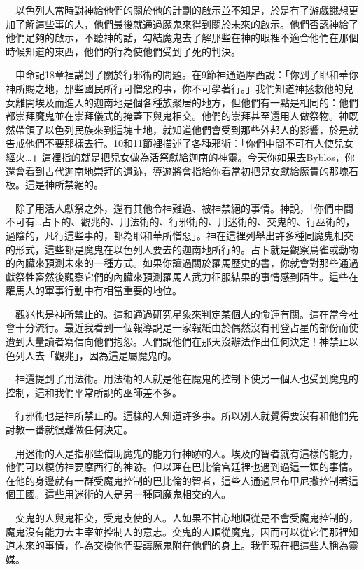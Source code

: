 \documentclass{book}
\begin{document}
　以色列人當時對神給他們的關於他的計劃的啟示並不知足，於是有了游戲餓想更加了解這些事的人，他們最後就通過魔鬼來得到關於未來的啟示。他們否認神給了他們足夠的啟示，不聽神的話，勾結魔鬼去了解那些在神的眼裡不適合他們在那個時候知道的東西，他們的行為使他們受到了死的判決。

　申命記18章裡講到了關於行邪術的問題。在9節神通過摩西說：「你到了耶和華你神所賜之地，那些國民所行可憎惡的事，你不可學著行。」我們知道神拯救他的兒女離開埃及而進入的迦南地是個各種族聚居的地方，但他們有一點是相同的：他們都崇拜魔鬼並在崇拜儀式的掩蓋下與鬼相交。他們的崇拜甚至還用人做祭物。神既然帶領了以色列民族來到這塊土地，就知道他們會受到那些外邦人的影響，於是就告戒他們不要那樣去行。10和11節裡描述了各種邪術：「你們中間不可有人使兒女經火…」這裡指的就是把兒女做為活祭獻給迦南的神靈。今天你如果去Byblos，你還會看到古代迦南地崇拜的遺跡，導遊將會指給你看當初把兒女獻給魔貴的那塊石板。這是神所禁絕的。

　除了用活人獻祭之外，還有其他令神難過、被神禁絕的事情。神說，「你們中間不可有…占卜的、觀兆的、用法術的、行邪術的、用迷術的、交鬼的、行巫術的，過陰的，凡行這些事的，都為耶和華所憎惡」。神在這裡列舉出許多種同魔鬼相交的形式，這些都是魔鬼在以色列人要去的迦南地所行的。占卜就是觀察鳥雀或動物的內臟來預測未來的一種方式。如果你讀過關於羅馬歷史的書，你就會對那些通過獻祭牲畜然後觀察它們的內臟來預測羅馬人武力征服結果的事情感到陌生。這些在羅馬人的軍事行動中有相當重要的地位。

　觀兆也是神所禁止的。這和通過研究星象來判定某個人的命運有關。這在當今社會十分流行。最近我看到一個報導說是一家報紙由於偶然沒有刊登占星的部份而使遭到大量讀者寫信向他們抱怨。人們說他們在那天沒辦法作出任何決定！神禁止以色列人去「觀兆」，因為這是屬魔鬼的。

　神還提到了用法術。用法術的人就是他在魔鬼的控制下使另一個人也受到魔鬼的控制，這和我們平常所說的巫師差不多。

　行邪術也是神所禁止的。這樣的人知道許多事。所以別人就覺得要沒有和他們先討教一番就很難做任何決定。

　用迷術的人是指那些借助魔鬼的能力行神跡的人。埃及的智者就有這樣的能力，他們可以模仿神要摩西行的神跡。但以理在巴比倫宮廷裡也遇到過這一類的事情。在他的身邊就有一群受魔鬼控制的巴比倫的智者，這些人通過尼布甲尼撒控制著這個王國。這些用迷術的人是另一種同魔鬼相交的人。

　交鬼的人與鬼相交，受鬼支使的人。人如果不甘心地順從是不會受魔鬼控制的，魔鬼沒有能力去主宰並控制人的意志。交鬼的人順從魔鬼，因而可以從它們那裡知道未來的事情，作為交換他們要讓魔鬼附在他們的身上。我們現在把這些人稱為靈媒。
\end{document}
